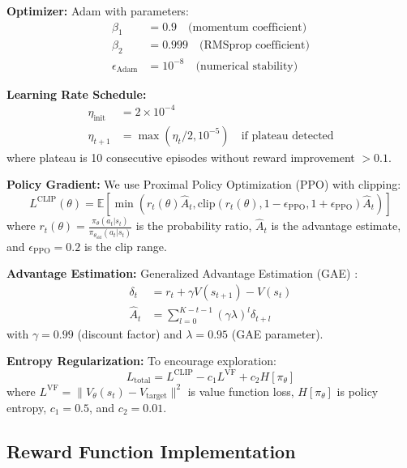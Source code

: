 \documentclass[12pt,a4paper]{article}
\begin{document}
\textbf{Optimizer:} Adam \cite{kingma2014adam} with parameters:
\begin{align}
\beta_1 &= 0.9 \quad \text{(momentum coefficient)} \\
\beta_2 &= 0.999 \quad \text{(RMSprop coefficient)} \\
\epsilon_{\text{Adam}} &= 10^{-8} \quad \text{(numerical stability)}
\end{align}

\textbf{Learning Rate Schedule:}
\begin{align}
\eta_{\text{init}} &= 2 \times 10^{-4} \label{eq:lr_init} \\
\eta_{t+1} &= \max(\eta_t / 2, 10^{-5}) \quad \text{if plateau detected} \label{eq:lr_decay}
\end{align}
where plateau is 10 consecutive episodes without reward improvement $>0.1$.

\textbf{Policy Gradient:}
We use Proximal Policy Optimization (PPO) \cite{schulman2017proximal} with clipping:
\begin{equation}
L^{\text{CLIP}}(\theta) = \mathbb{E}\left[\min\left(r_t(\theta)\hat{A}_t, \text{clip}(r_t(\theta), 1-\epsilon_{\text{PPO}}, 1+\epsilon_{\text{PPO}})\hat{A}_t\right)\right]
\label{eq:ppo_loss}
\end{equation}
where $r_t(\theta) = \frac{\pi_\theta(a_t|s_t)}{\pi_{\theta_{\text{old}}}(a_t|s_t)}$ is the probability ratio, $\hat{A}_t$ is the advantage estimate, and $\epsilon_{\text{PPO}}=0.2$ is the clip range.

\textbf{Advantage Estimation:}
Generalized Advantage Estimation (GAE) \cite{schulman2015high}:
\begin{align}
\delta_t &= r_t + \gamma V(s_{t+1}) - V(s_t) \label{eq:td_error} \\
\hat{A}_t &= \sum_{l=0}^{K-t-1} (\gamma \lambda)^l \delta_{t+l} \label{eq:gae}
\end{align}
with $\gamma=0.99$ (discount factor) and $\lambda=0.95$ (GAE parameter).

\textbf{Entropy Regularization:}
To encourage exploration:
\begin{equation}
L_{\text{total}} = L^{\text{CLIP}} - c_1 L^{\text{VF}} + c_2 H[\pi_\theta]
\label{eq:total_loss}
\end{equation}
where $L^{\text{VF}} = \|V_\theta(s_t) - V_{\text{target}}\|^2$ is value function loss, $H[\pi_\theta]$ is policy entropy, $c_1=0.5$, and $c_2=0.01$.

\subsection{Reward Function Implementation}
\end{document}

